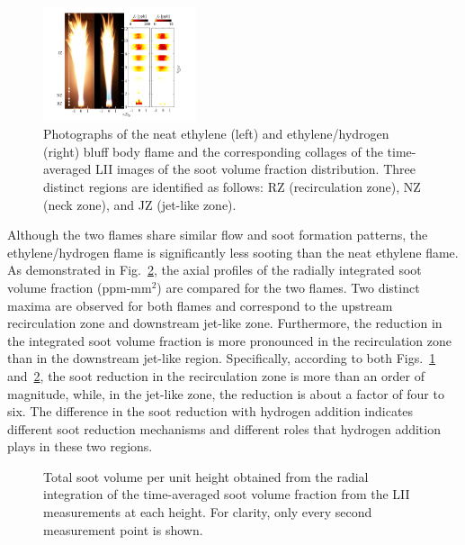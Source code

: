 \documentclass[review,3p,times]{elsarticle}
\begin{document}
\begin{figure}[t]
  \centering
  \scriptsize
  \vspace{-0.10in}
  \includegraphics[trim=14mm 5.0mm 14mm 5mm, clip=true, width=0.4\textwidth]{hy_overall_new.png}
  \normalsize
  \vspace{-0.1in}
  \caption{Photographs of the neat ethylene (left) and ethylene/hydrogen (right) bluff body flame and the corresponding collages of the time-averaged LII images of the soot volume fraction distribution.  Three distinct regions are identified as follows: RZ (recirculation zone), NZ (neck zone), and JZ (jet-like zone).}
  \label{fig:H2_overall}
\end{figure}

Although the two flames share similar flow and soot formation patterns, the ethylene/hydrogen flame is significantly less sooting than the neat ethylene flame.  As demonstrated in Fig.~\ref{fig:ifv}, the axial profiles of the radially integrated soot volume fraction (ppm-mm$^2$) are compared for the two flames.  Two distinct maxima are observed for both flames and correspond to the upstream recirculation zone and downstream jet-like zone.  Furthermore, the reduction in the integrated soot volume fraction is more pronounced in the recirculation zone than in the downstream jet-like region.  Specifically, according to both Figs.~\ref{fig:H2_overall} and~\ref{fig:ifv}, the soot reduction in the recirculation zone is more than an order of magnitude, while, in the jet-like zone, the reduction is about a factor of four to six.  The difference in the soot reduction with hydrogen addition indicates different soot reduction mechanisms and different roles that hydrogen addition plays in these two regions.  

\begin{figure}[t]
  \centering
  \scriptsize
  \vspace{-0.10in}
  \resizebox{0.5\textwidth}{!}{}
  \normalsize
  \vspace{-0.3in}
  \caption{Total soot volume per unit height obtained from the radial integration of the time-averaged soot volume fraction from the LII measurements at each height.  For clarity, only every second measurement point is shown.}
  \label{fig:ifv}
\end{figure}
\end{document}
